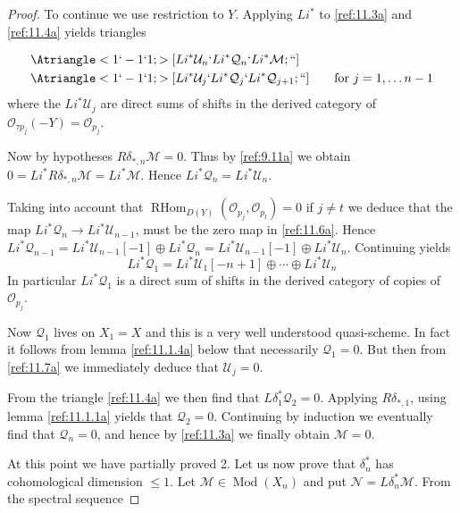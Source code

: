 \documentclass{amsproc}
\def\Mscr{{\mathcal M}}
\def\Nscr{{\mathcal N}}
\def\Oscr{{\mathcal O}}
\def\Qscr{{\mathcal Q}}
\def\Uscr{{\mathcal U}}
\def\RHom{\operatorname {RHom}}
\def\Qch{\operatorname {Mod}}
\def\r{\rightarrow}
\let\oldtext\text
\def\text#1{\oldtext{\upshape #1}}
\theoremstyle{definition}
\theoremstyle{remark}
\numberwithin{equation}{section}
\numberwithin{table}{section}
\numberwithin{figure}{section}
\begin{document}
\begin{proof}
To continue we use restriction to $Y$. Applying $Li^\ast$ to
\eqref{ref:11.3a} and \eqref{ref:11.4a} yields triangles


\begin{align} \label{ref:11.5a}
&\Atriangle<1`-1`1;>[Li^\ast\Uscr_{n}`Li^\ast\Qscr_n`Li^\ast\Mscr;``]\\
&\Atriangle<1`-1`1;>[Li^\ast\Uscr_{{j}}`Li^\ast\Qscr_{j}`Li^\ast\Qscr_{{j}+1};``]
\qquad \text{for ${j}=1,\ldots n-1$} \label{ref:11.6a}
\end{align}
where the $Li^\ast\Uscr_{j}$ are direct sums of shifts in the derived category
of $\Oscr_{\tau p_{j}}(-Y)=\Oscr_{p_{j}}$.





Now by hypotheses $R\delta_{\ast,n} \Mscr=0$. Thus by  \eqref{ref:9.11a}
we obtain
$
0= Li^\ast R\delta_{\ast,n} \Mscr=Li^\ast\Mscr
$. Hence $Li^\ast \Qscr_n=Li^\ast\Uscr_n$.

Taking into account that $\RHom_{D(Y)}(\Oscr_{p_{j}},\Oscr_{p_t})=0$ if
${j}\neq t$ we deduce that the map $Li^\ast\Qscr_n\r Li^\ast
\Uscr_{n-1}$, must be the zero map in \eqref{ref:11.6a}. Hence
 $Li^\ast \Qscr_{n-1}=Li^\ast \Uscr_{n-1}[-1]\oplus
Li^\ast\Qscr_n=Li^\ast\Uscr_{n-1}[-1]\oplus Li^\ast\Uscr_n$.
Continuing  yields
\begin{equation}
\label{ref:11.7a}
Li^\ast \Qscr_1=Li^\ast \Uscr_1[-n+1]\oplus\cdots \oplus
Li^\ast\Uscr_n
\end{equation}
In particular $Li^\ast\Qscr_1$ is a direct sum of shifts in the
derived category of copies of $\Oscr_{p_{j}}$. 

Now $\Qscr_1$ lives on $X_1=X$ and this is a very well understood
quasi-scheme. In fact it follows from lemma \ref{ref:11.1.4a} below that
necessarily $\Qscr_1=0$. But then from \eqref{ref:11.7a} we immediately
deduce that $\Uscr_{j}=0$.

From the triangle \eqref{ref:11.4a} we then find that
$L\delta_1^\ast\Qscr_2=0$. Applying $R\delta_{\ast,1}$, using lemma
\ref{ref:11.1.1a} yields that $\Qscr_2=0$. Continuing by induction we
eventually find that $\Qscr_n=0$, and hence by \eqref{ref:11.3a} we finally
obtain $\Mscr=0$.
 
 
 At this point we have partially proved 2. Let us now prove
 that $\delta^\ast_n$ has cohomological dimension $\le 1$. 
Let  $\Mscr\in \Qch(X_n)$ and put $\Nscr=L\delta_n^\ast\Mscr$. From
the spectral sequence
 

\end{proof}
\end{document}
